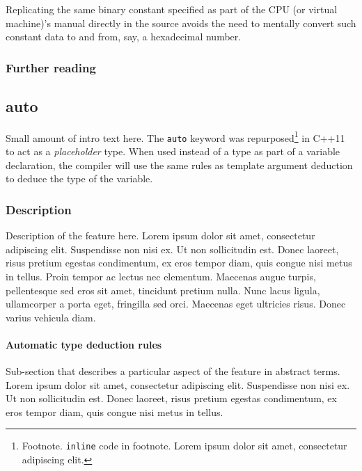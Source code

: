 \documentclass[twoside,10pt,letterpaper,usenames]{newstyle-PearsonGeneric-7-38}
\begin{document}
Replicating the same binary constant specified as part of the CPU (or
virtual machine)'s manual directly in the source avoids the need to
mentally convert such constant data to and from, say, a hexadecimal
number.

\subsubsection[Further reading]{Further reading}\label{further-reading}

\newpage

\subsection[\tt{auto}]{{\SubsecCode auto}}\label{auto}

Small amount of intro text here. The \texttt{auto} keyword was
repurposed{\cprotect\footnote{Footnote. \texttt{inline} code in
footnote. Lorem ipsum dolor sit amet, consectetur adipiscing elit.}}
in C++11 to act as a \emph{placeholder} type. When used instead of a
type as part of a variable declaration, the {compiler} will use the same
rules as {template argument deduction} to deduce the type of the
variable.

\subsubsection[Description]{Description}\label{description}

Description of the feature here. Lorem ipsum dolor sit amet, consectetur
adipiscing elit. Suspendisse non nisi ex. Ut non sollicitudin est. Donec
laoreet, risus pretium egestas condimentum, ex eros tempor diam, quis
congue nisi metus in tellus. Proin tempor ac lectus nec elementum.
Maecenas augue turpis, pellentesque sed eros sit amet, tincidunt pretium
nulla. Nunc lacus ligula, ullamcorper a porta eget, fringilla sed orci.
Maecenas eget ultricies risus. Donec varius vehicula diam.

\paragraph[Automatic type deduction rules]{Automatic type deduction rules}\label{automatic-type-deduction-rules}

Sub-section that describes a particular aspect of the feature in
abstract terms. Lorem ipsum dolor sit amet, consectetur adipiscing elit.
Suspendisse non nisi ex. Ut non sollicitudin est. Donec laoreet, risus
pretium egestas condimentum, ex eros tempor diam, quis congue nisi metus
in tellus.
\end{document}
